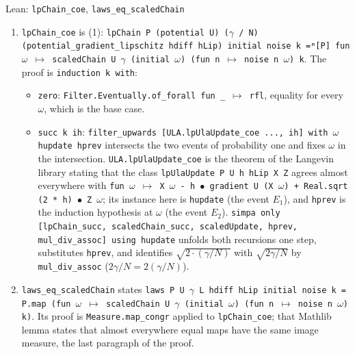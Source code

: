 \documentclass[11pt,a4paper]{report}
\begin{document}
\begin{leanbox}{Lean: \texttt{lpChain\_\allowbreak{}coe}, \texttt{laws\_\allowbreak{}eq\_\allowbreak{}scaledChain}}
\begin{enumerate}


\item \texttt{lp\allowbreak{}Chain\_\allowbreak{}coe} is (1): \texttt{lp\allowbreak{}Chain P (potential U) (\ensuremath{\gamma} /\allowbreak{} N) (potential\_\allowbreak{}gradient\_\allowbreak{}lipschitz hdiff h\allowbreak{}Lip) initial noise k =ᵐ[P] fun \ensuremath{\omega} \ensuremath{\mapsto} scaled\allowbreak{}Chain U \ensuremath{\gamma} (initial \ensuremath{\omega}) (fun n \ensuremath{\mapsto} noise n \ensuremath{\omega}) k}. The proof is \texttt{induction k with}:

\begin{itemize}


\item \texttt{zero}: \texttt{Filter.\allowbreak{}Eventually.\allowbreak{}of\_\allowbreak{}forall fun \_\allowbreak{} \ensuremath{\mapsto} rfl}, equality for every \(\omega\), which is the base case.

\item \texttt{succ k ih}: \texttt{filter\_\allowbreak{}upwards [ULA.\allowbreak{}lp\allowbreak{}Ula\allowbreak{}Update\_\allowbreak{}coe .\allowbreak{}.\allowbreak{}.\allowbreak{}, ih] with \ensuremath{\omega} hupdate hprev} intersects the two events of probability one and fixes \(\omega\) in the intersection. \texttt{ULA.\allowbreak{}lp\allowbreak{}Ula\allowbreak{}Update\_\allowbreak{}coe} is the theorem of the Langevin library stating that the class \texttt{lp\allowbreak{}Ula\allowbreak{}Update P U h h\allowbreak{}Lip X Z} agrees almost everywhere with \texttt{fun \ensuremath{\omega} \ensuremath{\mapsto} X \ensuremath{\omega} -\allowbreak{} h \ensuremath{\bullet} gradient U (X \ensuremath{\omega}) + Real.\allowbreak{}sqrt (2 * h) \ensuremath{\bullet} Z \ensuremath{\omega}}; its instance here is \texttt{hupdate} (the event \(E_1\)), and \texttt{hprev} is the induction hypothesis at \(\omega\) (the event \(E_2\)). \texttt{simpa only [lp\allowbreak{}Chain\_\allowbreak{}succ, scaled\allowbreak{}Chain\_\allowbreak{}succ, scaled\allowbreak{}Update, hprev, mul\_\allowbreak{}div\_\allowbreak{}assoc] using hupdate} unfolds both recursions one step, substitutes \texttt{hprev}, and identifies \(\sqrt{2\cdot(\gamma/N)}\) with \(\sqrt{2\gamma/N}\) by \texttt{mul\_\allowbreak{}div\_\allowbreak{}assoc} (\(2\gamma/N=2(\gamma/N)\)).

\end{itemize}


\item \texttt{laws\_\allowbreak{}eq\_\allowbreak{}scaled\allowbreak{}Chain} states \texttt{laws P U \ensuremath{\gamma} L hdiff h\allowbreak{}Lip initial noise k = P.\allowbreak{}map (fun \ensuremath{\omega} \ensuremath{\mapsto} scaled\allowbreak{}Chain U \ensuremath{\gamma} (initial \ensuremath{\omega}) (fun n \ensuremath{\mapsto} noise n \ensuremath{\omega}) k)}. Its proof is \texttt{Measure.\allowbreak{}map\_\allowbreak{}congr} applied to \texttt{lp\allowbreak{}Chain\_\allowbreak{}coe}; that Mathlib lemma states that almost everywhere equal maps have the same image measure, the last paragraph of the proof.


\end{enumerate}
\end{leanbox}
\end{document}
